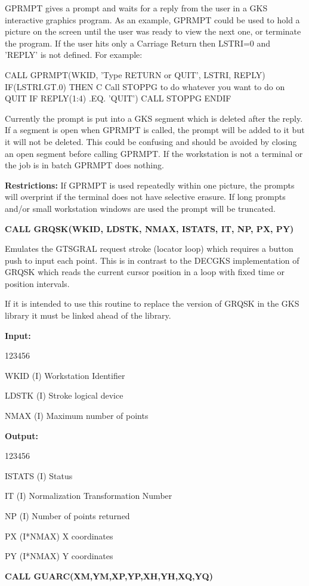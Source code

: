 \begin{OL}
GPRMPT gives a prompt and waits for a reply from the user in a GKS
interactive graphics program.
As an example, GPRMPT could be used to hold a picture on
the screen until the user was ready to view the next one,
or terminate the program.
If the user hits only a Carriage Return then LSTRI=0 and 'REPLY' is not
defined.  For example:
\begin{XMP}
      CALL GPRMPT(WKID, 'Type RETURN or QUIT', LSTRI, REPLY)
      IF(LSTRI.GT.0) THEN
C       Call STOPPG to do whatever you want to do on QUIT
        IF REPLY(1:4) .EQ. 'QUIT') CALL STOPPG
      ENDIF
\end{XMP}
 
Currently the prompt is put into a GKS segment which is deleted
after the reply.  If a segment is open when GPRMPT is called,
the prompt will be added to it but it will not be deleted. This
could be confusing and should be avoided by closing an open
segment before calling GPRMPT.
If the workstation is not a terminal or the job is in batch
GPRMPT does nothing.
 
{\bf Restrictions:} If GPRMPT is used repeatedly within one picture,
the prompts will overprint if the terminal does not have selective erasure.
If long prompts and/or small workstation windows are used the
prompt will be truncated.
\item {\bf CALL GRQSK(WKID, LDSTK, NMAX, ISTATS, IT, NP, PX, PY)}
 
Emulates the GTSGRAL request stroke (locator loop)
which requires a button push to input each point.
This is in contrast to the DECGKS implementation of GRQSK
which reads the current cursor position in a loop
with fixed time or position intervals.
\begin{note}
If it is intended to use this routine to replace the version of GRQSK in the
GKS library it must be linked ahead of the library.
\end{note}
 
{\bf Input:}
\begin{DLtt}{123456}
\item[WKID (I)]Workstation Identifier
\item[LDSTK (I)]Stroke logical device
\item[NMAX (I)]Maximum number of points
\end{DLtt}
 
{\bf Output:}
\begin{DLtt}{123456}
\item[ISTATS (I)]Status
\item[IT (I)]Normalization Transformation Number
\item[NP (I)]Number of points returned
\item[PX (I*NMAX)]X coordinates
\item[PY (I*NMAX)]Y coordinates
\end{DLtt}
\item {\bf CALL GUARC(XM,YM,XP,YP,XH,YH,XQ,YQ)}
 

\end{OL}
